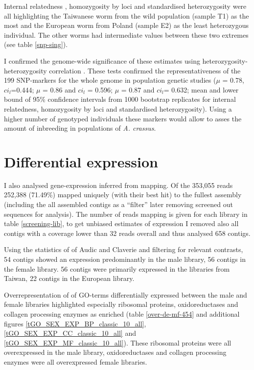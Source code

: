 Internal relatedness \cite{pmid11571049}, homozygosity by loci
\cite{pmid17107491} and standardised heterozygosity \cite{coltman81j}
were all highlighting the Taiwanese worm from the wild population
(sample T1) as the most and the European worm from Poland (sample E2)
as the least heterozygous individual. The other worms had intermediate
values between these two extremes (see table \ref{snp-sing}).

I confirmed the genome-wide significance of these estimates using
heterozygosity-heterozygosity correlation \cite{pmid21565077}. These
tests confirmed the representativeness of the 199 SNP-markers for the
whole genome in population genetic studies ($\mu$ = 0.78,
$ci_l$=0.444; $\mu$ = 0.86 and $ci_l$ = 0.596; $\mu$ = 0.87 and
$ci_l$= 0.632; mean and lower bound of 95\% confidence intervals from
1000 bootstrap replicates for internal relatedness, homozygosity by
loci and standardised heterozygosity). Using a higher number of
genotyped individuals these markers would allow to asses the amount of
inbreeding in populations of \textit{A. crassus}.


\section{Differential expression}

I also analysed gene-expression inferred from mapping. Of the 353,055
reads 252,388 (71.49\%) mapped uniquely (with their best hit) to the
fullest assembly (including the all assembled contigs as a ``filter''
later removing screened out sequences for analysis). The number of
reads mapping is given for each library in table \ref{screening-lib},
to get unbiased estimates of expression I removed also all contigs
with a coverage lower than 32 reads overall and thus analysed 658
contigs.

Using the statistics of of Audic and Claverie \cite{pmid9331369} and
filtering for relevant contrasts, 54 contigs showed an expression
predominantly in the male library, 56 contigs in the female
library. 56 contigs were primarily expressed in the libraries from
Taiwan, 22 contigs in the European library.

Overrepresentation of of GO-terms differentially expressed between the
male and female libraries highlighted especially ribosomal proteins,
oxidoreductases and collagen processing enzymes as enriched (table
\ref{over-de-mf-454} and additional figures
\ref{tGO_SEX_EXP_BP_classic_10_all},
\ref{tGO_SEX_EXP_CC_classic_10_all} and
\ref{tGO_SEX_EXP_MF_classic_10_all}). These ribosomal proteins were
all overexpressed in the male library, oxidoreductases and collagen
processing enzymes were all overexpressed female libraries.


